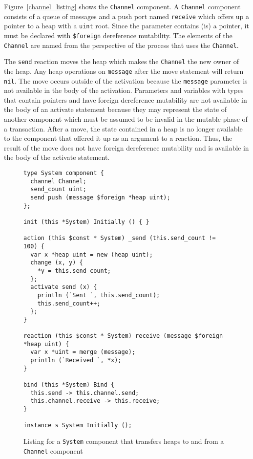 Figure~\ref{channel_listing} shows the \verb+Channel+ component.
A \verb+Channel+ component consists of a queue of messages and a push port named \verb+receive+ which offers up a pointer to a heap with a \verb+uint+ root.
Since the parameter contains (is) a pointer, it must be declared with \verb+$foreign+ dereference mutability.
The elements of the \verb+Channel+ are named from the perspective of the process that uses the \verb+Channel+.

The \verb+send+ reaction moves the heap which makes the \verb+Channel+ the new owner of the heap.
Any heap operations on \verb+message+ after the move statement will return \verb+nil+.
The move occurs outside of the activation because the \verb+message+ parameter is not available in the body of the activation.
Parameters and variables with types that contain pointers and have foreign dereference mutability are not available in the body of an activate statement because they may represent the state of another component which must be assumed to be invalid in the mutable phase of a transaction.
After a move, the state contained in a heap is no longer available to the component that offered it up as an argument to a reaction.
Thus, the result of the move does not have foreign dereference mutability and is available in the body of the activate statement.

\begin{figure}
\begin{verbatim}
type System component {
  channel Channel;
  send_count uint;
  send push (message $foreign *heap uint);
};

init (this *System) Initially () { }

action (this $const * System) _send (this.send_count != 100) {
  var x *heap uint = new (heap uint);
  change (x, y) {
    *y = this.send_count;
  };
  activate send (x) {
    println (`Sent `, this.send_count);
    this.send_count++;
  };
}

reaction (this $const * System) receive (message $foreign *heap uint) {
  var x *uint = merge (message);
  println (`Received `, *x);
}

bind (this *System) Bind {
  this.send -> this.channel.send;
  this.channel.receive -> this.receive;
}

instance s System Initially ();
\end{verbatim}
\cprotect\caption{Listing for a \verb+System+ component that transfers heaps to and from a \verb+Channel+ component\label{channel_system_listing}}
\end{figure}

